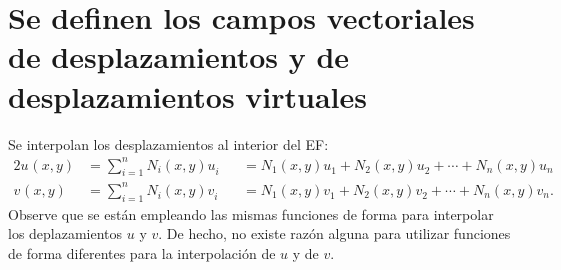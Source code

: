 \documentclass[12pt,letterpaper, landscape]{article}
\newcommand{\e}{{}}
\newcommand{\ve}[1]{{\boldsymbol{#1}}}
\newcommand{\ma}[1]{{\boldsymbol{#1}}}
\newcommand{\dd}{\operatorname{d} \!}
\begin{document}
%
%
%
%
%

\section{Se definen los campos vectoriales de desplazamientos y  de desplazamientos virtuales}
Se interpolan los desplazamientos al interior del EF:
\begin{alignat}{2}
u^\e(x,y) &= \sum_{i=1}^n N_i^\e(x,y) u_i^\e 
&&= N_1^\e(x,y) u_1^\e + N_2^\e(x,y) u_2^\e + \cdots + N_n^\e(x,y) u_n^\e  \\
v^\e(x,y) &= \sum_{i=1}^n N_i^\e(x,y) v_i^\e 
&&= N_1^\e(x,y) v_1^\e + N_2^\e(x,y) v_2^\e + \cdots + N_n(x,y) v_n.
\end{alignat}
Observe que se están empleando las mismas funciones de forma para interpolar los deplazamientos $u$ y $v$. De hecho, no existe razón alguna para utilizar funciones de forma diferentes para la interpolación de $u$ y de $v$. 

%
%
\end{document}
